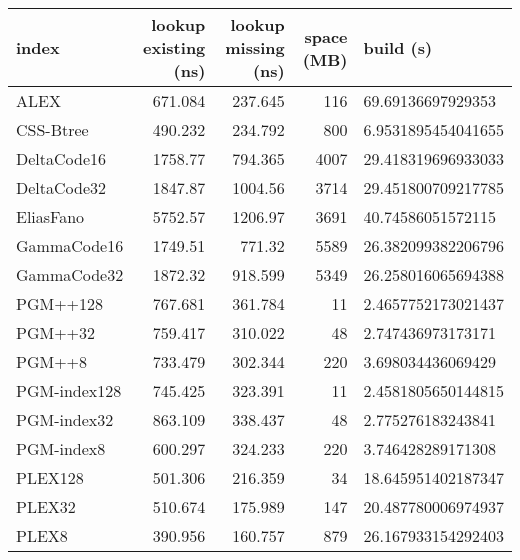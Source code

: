 \begin{tabular}{lrrrl}
\hline
 index             &   lookup existing (ns) &   lookup missing (ns) &   space (MB) & build (s)             \\
\hline
 ALEX              &                671.084 &               237.645 &          116 & 69.69136697929353     \\
 CSS-Btree         &                490.232 &               234.792 &          800 & 6.9531895454041655    \\
 DeltaCode16       &               1758.77  &               794.365 &         4007 & 29.418319696933033    \\
 DeltaCode32       &               1847.87  &              1004.56  &         3714 & 29.451800709217785    \\
 EliasFano         &               5752.57  &              1206.97  &         3691 & 40.74586051572115     \\
 GammaCode16       &               1749.51  &               771.32  &         5589 & 26.382099382206796    \\
 GammaCode32       &               1872.32  &               918.599 &         5349 & 26.258016065694388    \\
 PGM++128          &                767.681 &               361.784 &           11 & 2.4657752173021437    \\
 PGM++32           &                759.417 &               310.022 &           48 & 2.747436973173171     \\
 PGM++8            &                733.479 &               302.344 &          220 & 3.698034436069429     \\
 PGM-index128      &                745.425 &               323.391 &           11 & 2.4581805650144815    \\
 PGM-index32       &                863.109 &               338.437 &           48 & 2.775276183243841     \\
 PGM-index8        &                600.297 &               324.233 &          220 & 3.746428289171308     \\
 PLEX128           &                501.306 &               216.359 &           34 & 18.645951402187347    \\
 PLEX32            &                510.674 &               175.989 &          147 & 20.487780006974937    \\
 PLEX8             &                390.956 &               160.757 &          879 & 26.167933154292403    \\

\end{tabular}
